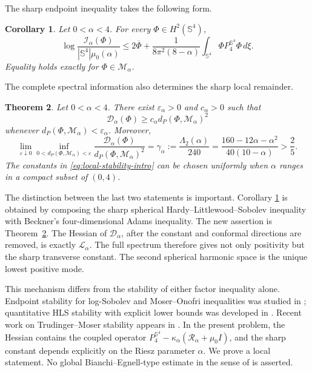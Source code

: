\documentclass[11pt]{article}
\newtheorem{theorem}{Theorem}[section]
\newtheorem{corollary}[theorem]{Corollary}
\numberwithin{equation}{section}
\begin{document}
The sharp endpoint inequality takes the following form.

\begin{corollary}\label{cor:sharp-Adams-Choquard}
Let \(0<\alpha<4\). For every \(\Phi\in H^{2}(\mathbb S^{4})\),
\begin{equation}\label{eq:sharp-Adams-Choquard}
\log\frac{\mathcal I_{\alpha}(\Phi)}
{|\mathbb S^{4}|\mu_{0}(\alpha)}
\leq2\overline{\Phi}
+\frac{1}{8\pi^{2}(8-\alpha)}
\int_{\mathbb S^{4}}\Phi P_{4}^{\mathbb S^{4}}\Phi\,d\xi.
\end{equation}
Equality holds exactly for \(\Phi\in\mathcal M_{\alpha}\).
\end{corollary}

The complete spectral information also determines the sharp local remainder.

\begin{theorem}\label{thm:Adams-Choquard-stability}
Let \(0<\alpha<4\). There exist \(\varepsilon_{\alpha}>0\) and
\(c_{\alpha}>0\) such that
\begin{equation}\label{eq:local-stability-intro}
\mathcal D_{\alpha}(\Phi)
\geq c_{\alpha}d_{P}(\Phi,\mathcal M_{\alpha})^{2}
\end{equation}
whenever \(d_{P}(\Phi,\mathcal M_{\alpha})<\varepsilon_{\alpha}\). Moreover,
\begin{equation}\label{eq:sharp-local-constant}
\lim_{\varepsilon\downarrow0}
\inf_{0<d_{P}(\Phi,\mathcal M_{\alpha})<\varepsilon}
\frac{\mathcal D_{\alpha}(\Phi)}
{d_{P}(\Phi,\mathcal M_{\alpha})^{2}}
=\gamma_{\alpha}
:=\frac{\Lambda_{2}(\alpha)}{240}
=\frac{160-12\alpha-\alpha^{2}}{40(10-\alpha)}
>\frac25.
\end{equation}
The constants in \eqref{eq:local-stability-intro} can be chosen uniformly when
\(\alpha\) ranges in a compact subset of \((0,4)\).
\end{theorem}

The distinction between the last two statements is important. Corollary
\ref{cor:sharp-Adams-Choquard} is obtained by composing the sharp spherical
Hardy--Littlewood--Sobolev inequality with Beckner's four-dimensional Adams
inequality. The new assertion is Theorem~\ref{thm:Adams-Choquard-stability}.
The Hessian of \(\mathcal D_\alpha\), after the constant and conformal directions
are removed, is exactly \(\mathcal L_\alpha\). The full spectrum therefore gives
not only positivity but the sharp transverse constant. The second spherical
harmonic space is the unique lowest positive mode.

This mechanism differs from the stability of either factor inequality alone.
Endpoint stability for log-Sobolev and Moser--Onofri inequalities was studied in
\cite{ChenLuTang}; quantitative HLS stability with explicit lower bounds was
developed in \cite{ChenLuTangHLS}. Recent work on Trudinger--Moser stability
appears in \cite{AndradeOliveiraDoMacedoRatzkin}. In the present problem, the
Hessian contains the coupled operator
\(P_{4}^{\mathbb S^{4}}-\kappa_\alpha(\mathcal R_\alpha+\mu_0I)\), and the sharp
constant depends explicitly on the Riesz parameter \(\alpha\). We prove a local
statement. No global Bianchi--Egnell-type estimate in the sense of \cite{BianchiEgnell} is asserted.
\end{document}
